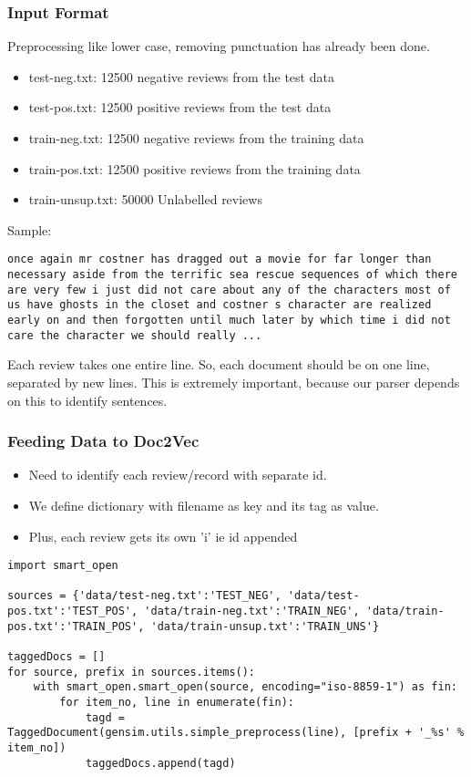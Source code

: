 \begin{frame}[fragile]\frametitle{Input Format}
Preprocessing like lower case, removing punctuation has already been done.

\begin{itemize}
\item test-neg.txt: 12500 negative  reviews from the test data
\item test-pos.txt: 12500 positive  reviews from the test data
\item train-neg.txt: 12500 negative  reviews from the training data
\item train-pos.txt: 12500 positive  reviews from the training data
\item train-unsup.txt: 50000 Unlabelled  reviews
\end{itemize}

Sample:
\begin{lstlisting}
once again mr costner has dragged out a movie for far longer than necessary aside from the terrific sea rescue sequences of which there are very few i just did not care about any of the characters most of us have ghosts in the closet and costner s character are realized early on and then forgotten until much later by which time i did not care the character we should really ...
\end{lstlisting}

Each review takes one entire line. So, each document should be on one line, separated by new lines. This is extremely important, because our parser depends on this to identify sentences.
\end{frame}

\begin{frame}[fragile]\frametitle{Feeding Data to Doc2Vec}
\begin{itemize}
\item Need to identify each review/record with separate id.
\item We define dictionary with filename as key and its tag as value.
\item Plus, each review gets its own 'i' ie id appended
\end{itemize}
\begin{lstlisting}
import smart_open

sources = {'data/test-neg.txt':'TEST_NEG', 'data/test-pos.txt':'TEST_POS', 'data/train-neg.txt':'TRAIN_NEG', 'data/train-pos.txt':'TRAIN_POS', 'data/train-unsup.txt':'TRAIN_UNS'}

taggedDocs = []
for source, prefix in sources.items():
    with smart_open.smart_open(source, encoding="iso-8859-1") as fin:
        for item_no, line in enumerate(fin):
            tagd = TaggedDocument(gensim.utils.simple_preprocess(line), [prefix + '_%s' % item_no])
            taggedDocs.append(tagd)
\end{lstlisting}

\end{frame}


